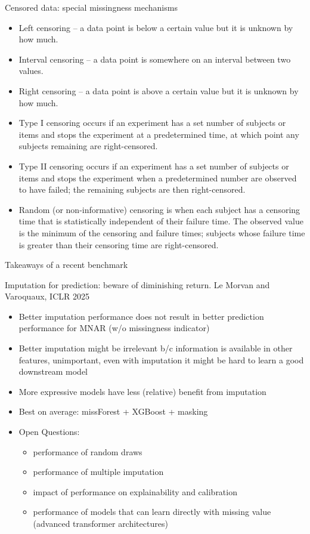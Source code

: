 \documentclass[11pt,compress,t,notes=noshow, aspectratio=169, xcolor=table]{beamer}
\begin{document}
\begin{frame}{Censored data: special missingness mechanisms}
    \small
    \begin{itemize}
        \item Left censoring – a data point is below a certain value but it is unknown by how much.
        \item Interval censoring – a data point is somewhere on an interval between two values.
        \item Right censoring – a data point is above a certain value but it is unknown by how much.
        \item Type I censoring occurs if an experiment has a set number of subjects or items and stops the experiment at a predetermined time, at which point any subjects remaining are right-censored.
        \item Type II censoring occurs if an experiment has a set number of subjects or items and stops the experiment when a predetermined number are observed to have failed; the remaining subjects are then right-censored.
        \item Random (or non-informative) censoring is when each subject has a censoring time that is statistically independent of their failure time. The observed value is the minimum of the censoring and failure times; subjects whose failure time is greater than their censoring time are right-censored.
    \end{itemize}
\end{frame}

\begin{frame}{Takeaways of a recent benchmark}

Imputation for prediction: beware of diminishing return. Le Morvan and Varoquaux, ICLR 2025 \href{https://arxiv.org/pdf/2407.19804}{}

\begin{itemize}
    \item Better imputation performance does not result in better prediction performance for MNAR (w/o missingness indicator)
    \item Better imputation might be irrelevant b/c information is available in other features, unimportant, even with imputation it might be hard to learn a good downstream model
    \item More expressive models have less (relative) benefit from imputation
    \item Best on average: missForest + XGBoost + masking
    \item Open Questions:
    \begin{itemize}
        \item performance of random draws
        \item performance of multiple imputation
        \item impact of performance on explainability and calibration
        \item performance of models that can learn directly with missing value (advanced transformer architectures)
    \end{itemize}
\end{itemize}
    
\end{frame}
\end{document}
